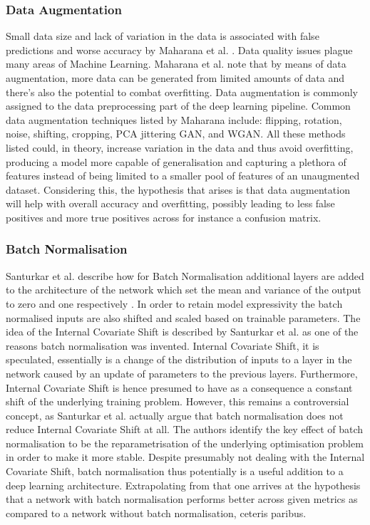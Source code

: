 \subsubsection{Data Augmentation}\label{augmentationtheory}
Small data size and lack of variation in the data is associated with false predictions and worse accuracy by Maharana et al. \cite{maharana2022review}.  Data quality issues plague many areas of Machine Learning. Maharana et al. note that by means of data augmentation, more data can be generated from limited amounts of data and there's also the potential to combat overfitting. Data augmentation is commonly assigned to the data preprocessing part of the deep learning pipeline. Common data augmentation techniques listed by Maharana include: flipping, rotation, noise, shifting, cropping, PCA jittering GAN, and WGAN. All these methods listed could, in theory, increase variation in the data and thus avoid overfitting, producing a model more capable of generalisation and capturing a plethora of features instead of being limited to a smaller pool of features of an unaugmented dataset. Considering this, the hypothesis that arises is that data augmentation will help with overall accuracy and overfitting, possibly leading to less false positives and more true positives across for instance a confusion matrix.


\subsubsection{Batch Normalisation}\label{batchnormtheory}
Santurkar et al. describe how for Batch Normalisation additional layers are added to the architecture of the network which set the mean and variance of the output to zero and one respectively \citep{santurkar2018does}. In order to retain model expressivity the batch normalised inputs are also shifted and scaled based on trainable parameters. The idea of the Internal Covariate Shift is described by Santurkar et al. as one of the reasons batch normalisation was invented. Internal Covariate Shift, it is speculated, essentially is a change of the distribution of inputs to a layer in the network caused by an update of parameters to the previous layers. Furthermore, Internal Covariate Shift is hence presumed to have as a consequence a constant shift of the underlying training problem. However, this remains a controversial concept, as Santurkar et al. actually argue that batch normalisation does not reduce Internal Covariate Shift at all. The authors identify the key effect of batch normalisation to be the reparametrisation of the underlying optimisation problem in order to make it more stable. Despite presumably not dealing with the Internal Covariate Shift, batch normalisation thus potentially is a useful addition to a deep learning architecture. Extrapolating from that one arrives at the hypothesis that a network with batch normalisation performs better across given metrics as compared to a network without batch normalisation, ceteris paribus.


